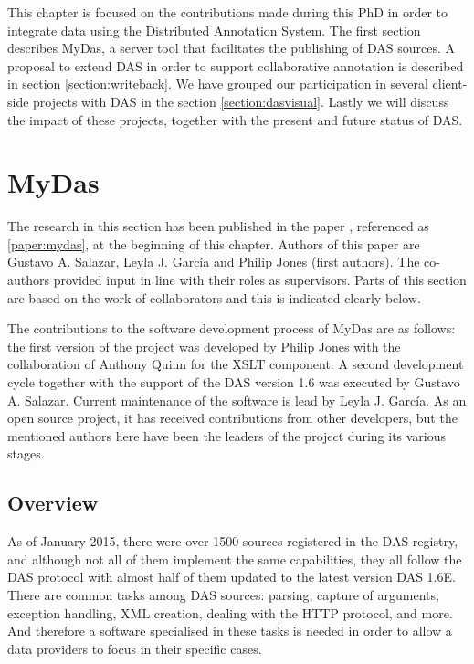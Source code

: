 This chapter is focused on the contributions made during this PhD in order to integrate data using the Distributed Annotation System. The first section describes  MyDas, a server tool that facilitates the publishing of DAS sources. A proposal to extend DAS in order to support collaborative annotation is described in section \ref{section:writeback}. We have grouped our participation in several client-side projects with DAS in the section \ref{section:dasvisual}. Lastly we will discuss the impact of these projects, together with the present and future status of DAS. 

\section{MyDas} \label{section:mydas}

The research in this section has been published in the paper \cite{SAL2012}, referenced as \ref{paper:mydas}, at the beginning of this chapter. Authors of this paper are Gustavo A. Salazar, Leyla J. García and Philip Jones (first authors). The co-authors provided input in line with their roles as supervisors.  Parts of this section are based on the work of collaborators and this is indicated clearly below. 

The contributions to the software development process of MyDas are as follows: the first version of the project was developed by Philip Jones with the collaboration of Anthony Quinn for the XSLT component. A second development cycle together with the support of the DAS version 1.6 was executed by Gustavo A. Salazar. Current maintenance of the software is lead by Leyla J. García. As an open source project, it has received contributions from other developers, but the mentioned authors here have been the leaders of the project during its various stages.

\subsection{Overview}

As of January 2015, there were over 1500 sources registered in the DAS registry, and although not all of them implement the same capabilities, they all follow the DAS protocol with almost half of them updated to the latest version DAS 1.6E. There are common tasks among DAS sources:  parsing, capture of arguments, exception handling, XML creation, dealing with the HTTP protocol, and more. And therefore a software specialised in these tasks is needed in order to allow a data providers to focus in their specific cases.

